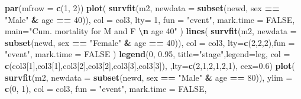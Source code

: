 \documentclass[
]{book}
\newenvironment{Shaded}{\begin{snugshade}}{\end{snugshade}}
\newcommand{\AttributeTok}[1]{\textcolor[rgb]{0.13,0.29,0.53}{#1}}
\newcommand{\ConstantTok}[1]{\textcolor[rgb]{0.56,0.35,0.01}{#1}}
\newcommand{\DecValTok}[1]{\textcolor[rgb]{0.00,0.00,0.81}{#1}}
\newcommand{\FloatTok}[1]{\textcolor[rgb]{0.00,0.00,0.81}{#1}}
\newcommand{\FunctionTok}[1]{\textcolor[rgb]{0.13,0.29,0.53}{\textbf{#1}}}
\newcommand{\NormalTok}[1]{#1}
\newcommand{\SpecialCharTok}[1]{\textcolor[rgb]{0.81,0.36,0.00}{\textbf{#1}}}
\newcommand{\StringTok}[1]{\textcolor[rgb]{0.31,0.60,0.02}{#1}}
\begin{document}
\begin{Shaded}
\begin{Highlighting}[]
\FunctionTok{par}\NormalTok{(}\AttributeTok{mfrow =} \FunctionTok{c}\NormalTok{(}\DecValTok{1}\NormalTok{, }\DecValTok{2}\NormalTok{))}
\FunctionTok{plot}\NormalTok{(}
  \FunctionTok{survfit}\NormalTok{(m2, }\AttributeTok{newdata =} \FunctionTok{subset}\NormalTok{(newd, sex }\SpecialCharTok{==} \StringTok{"Male"} \SpecialCharTok{\&}\NormalTok{ age }\SpecialCharTok{==} \DecValTok{40}\NormalTok{)),}
  \AttributeTok{col =}\NormalTok{ col3, }
  \AttributeTok{lty=} \DecValTok{1}\NormalTok{,}
  \AttributeTok{fun =} \StringTok{"event"}\NormalTok{, }\AttributeTok{mark.time =} \ConstantTok{FALSE}\NormalTok{,}
  \AttributeTok{main=}\StringTok{"Cum. mortality for M and F }\SpecialCharTok{\textbackslash{}n}\StringTok{ age 40"}
\NormalTok{  )}
\FunctionTok{lines}\NormalTok{(}
  \FunctionTok{survfit}\NormalTok{(m2, }\AttributeTok{newdata =} \FunctionTok{subset}\NormalTok{(newd, sex }\SpecialCharTok{==} \StringTok{"Female"} \SpecialCharTok{\&}\NormalTok{ age }\SpecialCharTok{==} \DecValTok{40}\NormalTok{)),}
  \AttributeTok{col =}\NormalTok{ col3, }\AttributeTok{lty=}\FunctionTok{c}\NormalTok{(}\DecValTok{2}\NormalTok{,}\DecValTok{2}\NormalTok{,}\DecValTok{2}\NormalTok{),}\AttributeTok{fun =} \StringTok{"event"}\NormalTok{, }\AttributeTok{mark.time =} \ConstantTok{FALSE}
\NormalTok{)}
\FunctionTok{legend}\NormalTok{(}\DecValTok{0}\NormalTok{, }\FloatTok{0.95}\NormalTok{, }\AttributeTok{title=}\StringTok{"stage"}\NormalTok{,}\AttributeTok{legend=}\NormalTok{leg,}
       \AttributeTok{col =} \FunctionTok{c}\NormalTok{(col3[}\DecValTok{1}\NormalTok{],col3[}\DecValTok{1}\NormalTok{],col3[}\DecValTok{2}\NormalTok{],col3[}\DecValTok{2}\NormalTok{],col3[}\DecValTok{3}\NormalTok{],col3[}\DecValTok{3}\NormalTok{]),}
\NormalTok{        ,}\AttributeTok{lty=}\FunctionTok{c}\NormalTok{(}\DecValTok{2}\NormalTok{,}\DecValTok{1}\NormalTok{,}\DecValTok{2}\NormalTok{,}\DecValTok{1}\NormalTok{,}\DecValTok{2}\NormalTok{,}\DecValTok{1}\NormalTok{), }\AttributeTok{cex=}\FloatTok{0.6}\NormalTok{)}
\FunctionTok{plot}\NormalTok{(}
  \FunctionTok{survfit}\NormalTok{(m2, }\AttributeTok{newdata =} \FunctionTok{subset}\NormalTok{(newd, sex }\SpecialCharTok{==} \StringTok{"Male"} \SpecialCharTok{\&}\NormalTok{ age }\SpecialCharTok{==} \DecValTok{80}\NormalTok{)),}
  \AttributeTok{ylim =} \FunctionTok{c}\NormalTok{(}\DecValTok{0}\NormalTok{, }\DecValTok{1}\NormalTok{), }\AttributeTok{col =}\NormalTok{ col3, }\AttributeTok{fun =} \StringTok{"event"}\NormalTok{, }\AttributeTok{mark.time =} \ConstantTok{FALSE}\NormalTok{,}

\end{Highlighting}
\end{Shaded}
\end{document}

